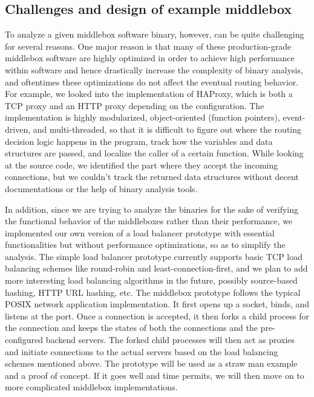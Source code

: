 \subsection{Challenges and design of example middlebox}

To analyze a given middlebox software binary, however, can be quite challenging
for several reasons. One major reason is that many of these production-grade
middlebox software are highly optimized in order to achieve high performance
within software and hence drastically increase the complexity of binary
analysis, and oftentimes these optimizations do not affect the eventual routing
behavior. For example, we looked into the implementation of HAProxy, which is
both a TCP proxy and an HTTP proxy depending on the configuration. The
implementation is highly modularized, object-oriented (function pointers),
event-driven, and multi-threaded, so that it is difficult to figure out where
the routing decision logic happens in the program, track how the variables and
data structures are passed, and localize the caller of a certain function. While
looking at the source code, we identified the part where they accept the
incoming connections, but we couldn't track the returned data structures without
decent documentations or the help of binary analysis tools.

In addition, since we are trying to analyze the binaries for the sake of
verifying the functional behavior of the middleboxes rather than their
performance, we implemented our own version of a load balancer prototype with
essential functionalities but without performance optimizations, so as to
simplify the analysis. The simple load balancer prototype currently supports
basic TCP load balancing schemes like round-robin and least-connection-first,
and we plan to add more interesting load balancing algorithms in the future,
possibly source-based hashing, HTTP URL hashing, etc. The middlebox prototype
follows the typical POSIX network application implementation. It first opens up
a socket, binds, and listens at the port. Once a connection is accepted, it then
forks a child process for the connection and keeps the states of both the
connections and the pre-configured backend servers. The forked child processes
will then act as proxies and initiate connections to the actual servers based on
the load balancing schemes mentioned above. The prototype will be used as a
straw man example and a proof of concept. If it goes well and time permits, we
will then move on to more complicated middlebox implementations.

